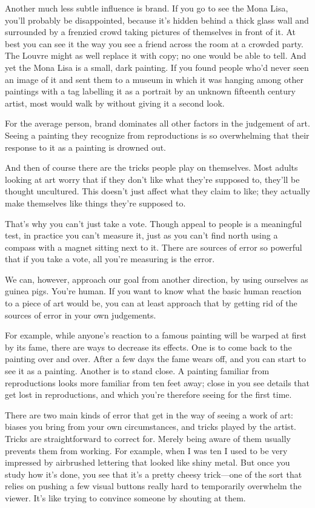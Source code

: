 Another much less subtle influence is brand. If you go to see the Mona
Lisa, you'll probably be disappointed, because it's hidden behind a
thick glass wall and surrounded by a frenzied crowd taking pictures of
themselves in front of it. At best you can see it the way you see a
friend across the room at a crowded party. The Louvre might as well
replace it with copy; no one would be able to tell. And yet the Mona
Lisa is a small, dark painting. If you found people who'd never seen an
image of it and sent them to a museum in which it was hanging among
other paintings with a tag labelling it as a portrait by an unknown
fifteenth century artist, most would walk by without giving it a second
look.

For the average person, brand dominates all other factors in the
judgement of art. Seeing a painting they recognize from reproductions is
so overwhelming that their response to it as a painting is drowned out.

And then of course there are the tricks people play on themselves. Most
adults looking at art worry that if they don't like what they're
supposed to, they'll be thought uncultured. This doesn't just affect
what they claim to like; they actually make themselves like things
they're supposed to.

That's why you can't just take a vote. Though appeal to people is a
meaningful test, in practice you can't measure it, just as you can't
find north using a compass with a magnet sitting next to it. There are
sources of error so powerful that if you take a vote, all you're
measuring is the error.

We can, however, approach our goal from another direction, by using
ourselves as guinea pigs. You're human. If you want to know what the
basic human reaction to a piece of art would be, you can at least
approach that by getting rid of the sources of error in your own
judgements.

For example, while anyone's reaction to a famous painting will be warped
at first by its fame, there are ways to decrease its effects. One is to
come back to the painting over and over. After a few days the fame wears
off, and you can start to see it as a painting. Another is to stand
close. A painting familiar from reproductions looks more familiar from
ten feet away; close in you see details that get lost in reproductions,
and which you're therefore seeing for the first time.

There are two main kinds of error that get in the way of seeing a work
of art: biases you bring from your own circumstances, and tricks played
by the artist. Tricks are straightforward to correct for. Merely being
aware of them usually prevents them from working. For example, when I
was ten I used to be very impressed by airbrushed lettering that looked
like shiny metal. But once you study how it's done, you see that it's a
pretty cheesy trick---one of the sort that relies on pushing a few
visual buttons really hard to temporarily overwhelm the viewer. It's
like trying to convince someone by shouting at them.

